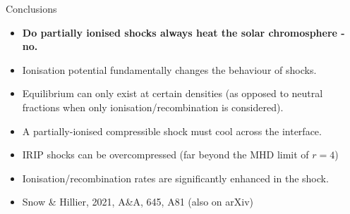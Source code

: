 \documentclass[10pt,aspectratio=169,usenames,dvipsnames]{beamer}
\begin{document}
\begin{frame}{Conclusions}
\begin{itemize}
    \item \textbf{Do partially ionised shocks always heat the solar chromosphere - no.}
    \item Ionisation potential fundamentally changes the behaviour of shocks.
    \item Equilibrium can only exist at certain densities (as opposed to neutral fractions when only ionisation/recombination is considered).
    \item A partially-ionised compressible shock must cool across the interface.
    \item IRIP shocks can be overcompressed (far beyond the MHD limit of $r=4$)
    \item Ionisation/recombination rates are significantly enhanced in the shock.
    \item Snow \& Hillier, 2021, A\&A, 645, A81 (also on arXiv)
\end{itemize}
\end{frame}



\end{document}
